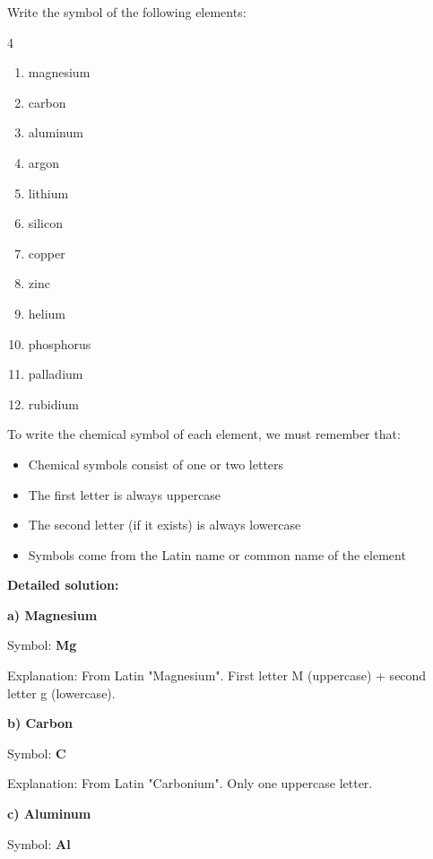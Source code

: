 \begin{exercise}
    Write the symbol of the following elements:
    \begin{multicols}{4}
        \begin{enumerate}[label=\letraminuscula]
        \item magnesium
        \item carbon
        \item aluminum
        \item argon
        \item lithium
        \item silicon
        \item copper
        \item zinc
        \item helium
        \item phosphorus
        \item palladium
        \item rubidium
        \end{enumerate}
    \end{multicols}
    \begin{solu}
        To write the chemical symbol of each element, we must remember that:
        \begin{itemize}
            \item Chemical symbols consist of one or two letters
            \item The first letter is always uppercase
            \item The second letter (if it exists) is always lowercase
            \item Symbols come from the Latin name or common name of the element
        \end{itemize}

        \textbf{Detailed solution:}

        \textbf{a) Magnesium}

        Symbol: \textbf{Mg}

        Explanation: From Latin "Magnesium". First letter M (uppercase) + second letter g (lowercase).

        \textbf{b) Carbon}

        Symbol: \textbf{C}

        Explanation: From Latin "Carbonium". Only one uppercase letter.

        \textbf{c) Aluminum}

        Symbol: \textbf{Al}


\end{solu}
\end{exercise}
